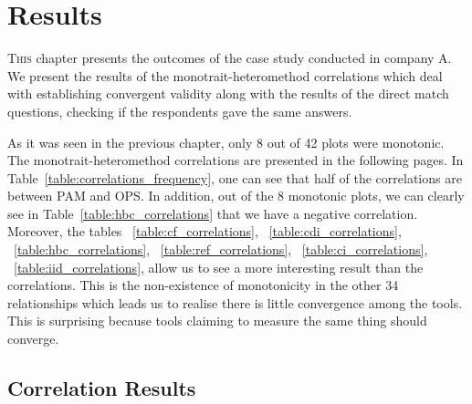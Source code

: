 \chapter{Results}
\label{ch:results}


\lettrine[lines=4, loversize=-0.1, lraise=0.1]{T}{his} chapter presents the outcomes of the case study conducted in company A. We present the results of the monotrait-heteromethod correlations which deal with establishing convergent validity along with the results of the direct match questions, checking if the respondents gave the same answers.

As it was seen in the previous chapter, only 8 out of 42 plots were monotonic. The monotrait-heteromethod correlations are presented in the following pages. In Table~\ref{table:correlations_frequency}, one can see that half of the correlations are between \ac{PAM} and \ac{OPS}. In addition, out of the 8 monotonic plots, we can clearly see in Table~\ref{table:hbc_correlations} that we have a negative correlation. Moreover, the tables ~\ref{table:cf_correlations}, ~\ref{table:cdi_correlations}, ~\ref{table:hbc_correlations}, ~\ref{table:ref_correlations}, ~\ref{table:ci_correlations}, ~\ref{table:iid_correlations}, allow us to see a more interesting result than the correlations. This is the non-existence of monotonicity in the other 34 relationships which leads us to realise there is little convergence among the tools. This is surprising because tools claiming to measure the same thing should converge.  %
\section{Correlation Results}

